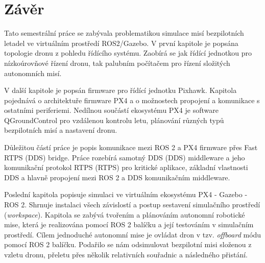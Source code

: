 \chapter*{Závěr}
{}

Tato semestrální práce se zabývala problematikou simulace misí bezpilotních letadel ve virtuálním prostředí ROS2/Gazebo. V první kapitole je popsána topologie dronu z pohledu řídícího systému. Zaobírá se jak řídící jednotkou pro nízkoúrovňové řízení dronu, tak palubním počítačem pro řízení složitých autonomních misí.

V další kapitole je popsán firmware pro řídící jednotku Pixhawk. Kapitola pojednává o architektuře firmware PX4 a o možnostech propojení a komunikace s ostatními periferiemi. Nedílnou součástí ekosystému PX4 je software QGroundControl pro vzdálenou kontrolu letu, plánování různých typů bezpilotních misí a nastavení dronu.

Důležitou částí práce je popis komunikace mezi ROS 2 a PX4 firmware přes Fast RTPS (\acs{DDS}) bridge. Práce rozebírá samotný \acs{DDS} (\acl{DDS}) middleware a jeho komunikační protokol \acs{RTPS} (\acl{RTPS}) pro kritické aplikace, základní vlastnosti \acs{DDS} a hlavně propojení mezi ROS 2 a \acs{DDS} komunikačním middleware.

Poslední kapitola popisuje simulaci ve virtuálním ekosystému PX4 - Gazebo - ROS 2. Shrnuje instalaci všech závislostí a postup sestavení simulačního prostředí (\textit{workspace}). Kapitola se zabývá tvořením a plánováním autonomní robotické mise, která je realizována pomocí ROS 2 balíčku a její testováním v simulačním prostředí. Cílem jednoduché autonomní mise je ovládat dron v tzv. \textit{offboard} módu pomocí ROS 2 balíčku. Podařilo se nám odsimulovat bezpilotní misi složenou z vzletu dronu, přeletu přes několik relativních souřadnic a následného přistání.

